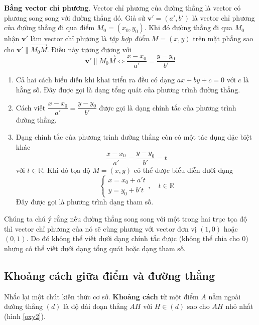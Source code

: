 \textbf{Bằng vector chỉ phương}. Vector chỉ phương của đường thẳng là vector có phương song song với đường thẳng đó. Giả sử $\bm{v}' = (a', b')$ là vector chỉ phương của đường thẳng đi qua điểm $M_0 = (x_0, y_0)$. Khi đó đường thẳng đi qua $M_0$ nhận $\bm{v}'$ làm vector chỉ phương là \textit{tập hợp điểm} $M = (x, y)$ trên mặt phẳng sao cho $\bm{v}' \parallel \overrightarrow{M_0 M}$. Điều này tương đương với
\begin{equation}
	\bm{v}' \parallel \overrightarrow{M_0 M} \Leftrightarrow \frac{x - x_0}{a'} = \frac{y - y_0}{b'}
\end{equation}

\begin{enumerate}
	\item Cả hai cách biểu diễn khi khai triển ra đều có dạng $a x + by + c = 0$ với $c$ là hằng số. Đây được gọi là dạng tổng quát của phương trình đường thẳng. 
	
	\item Cách viết $\dfrac{x - x_0}{a'} = \dfrac{y - y_0}{b'}$ được gọi là dạng chính tắc của phương trình đường thẳng.
	
	\item Dạng chính tắc của phương trình đường thẳng còn có một tác dụng đặc biệt khác \[\frac{x - x_0}{a'} = \frac{y - y_0}{b'} = t\] với $t \in \mathbb{R}$. Khi đó tọa độ $M = (x, y)$ có thể được biểu diễn dưới dạng
	\begin{equation}
		\begin{cases}
			x = x_0 + a' t \\ y = y_0 + b' t
		\end{cases}, \quad t \in \mathbb{R}
	\end{equation}
	Đây được gọi là phương trình dạng tham số.
\end{enumerate}

Chúng ta chú ý rằng nếu đường thẳng song song với một trong hai trục tọa độ thì vector chỉ phương của nó sẽ cùng phương với vector đơn vị $(1, 0)$ hoặc $(0, 1)$. Do đó không thể viết dưới dạng chính tắc được (không thể chia cho 0) nhưng có thể viết dưới dạng tổng quát hoặc dạng tham số.

\subsection*{Khoảng cách giữa điểm và đường thẳng}

Nhắc lại một chút kiến thức cơ sở. \textbf{Khoảng cách} từ một điểm $A$ nằm ngoài đường thẳng $(d)$ là độ dài đoạn thẳng $AH$ với $H \in (d)$ sao cho $AH$ nhỏ nhất (hình \ref{oxy2}).

